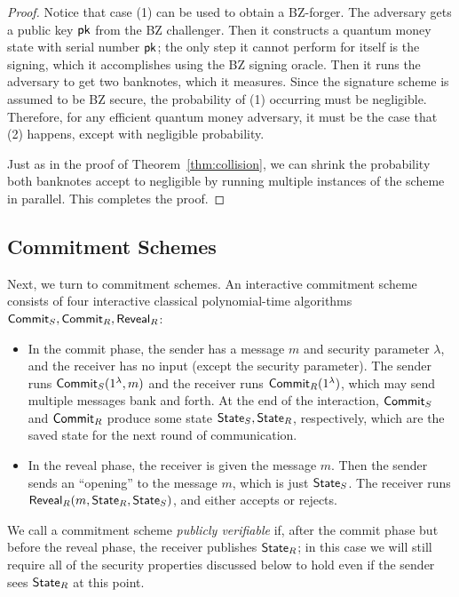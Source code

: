 \begin{proof}
Notice that case (1) can be used to obtain a BZ-forger.  The adversary gets a public key ${\sf pk}$ from the BZ challenger.  Then it constructs a quantum money state with serial number ${\sf pk}$; the only step it cannot perform for itself is the signing, which it accomplishes using the BZ signing oracle.  Then it runs the adversary to get two banknotes, which it measures.  Since the signature scheme is assumed to be BZ secure, the probability of (1) occurring must be negligible.  Therefore, for any efficient quantum money adversary, it must be the case that (2) happens, except with negligible probability.

Just as in the proof of Theorem~\ref{thm:collision}, we can shrink the probability both banknotes accept to negligible by running multiple instances of the scheme in parallel.  This completes the proof.\end{proof}










\subsection{Commitment Schemes}

Next, we turn to commitment schemes.  An interactive commitment scheme consists of four interactive classical polynomial-time algorithms ${\sf Commit}_S,{\sf Commit}_R,{\sf Reveal}_R$:
\begin{itemize}
	\item In the commit phase, the sender has a message $m$ and security parameter $\lambda$, and the receiver has no input (except the security parameter).  The sender runs ${\sf Commit}_S(1^\lambda,m)$ and the receiver runs ${\sf Commit}_R(1^\lambda)$, which may send multiple messages bank and forth.  At the end of the interaction, ${\sf Commit}_S$ and ${\sf Commit}_R$ produce some state ${\sf State}_S,{\sf State}_R$, respectively, which are the saved state for the next round of communication. 
	\item In the reveal phase, the receiver is given the message $m$.  Then the sender sends an ``opening'' to the message $m$, which is just ${\sf State}_S$.  The receiver runs ${\sf Reveal}_R(m,{\sf State}_R,{\sf State}_S)$, and either accepts or rejects.
\end{itemize}

We call a commitment scheme \emph{publicly verifiable} if, after the commit phase but before the reveal phase, the receiver publishes ${\sf State}_R$; in this case we will still require all of the security properties discussed below to hold even if the sender sees ${\sf State}_R$ at this point.  


